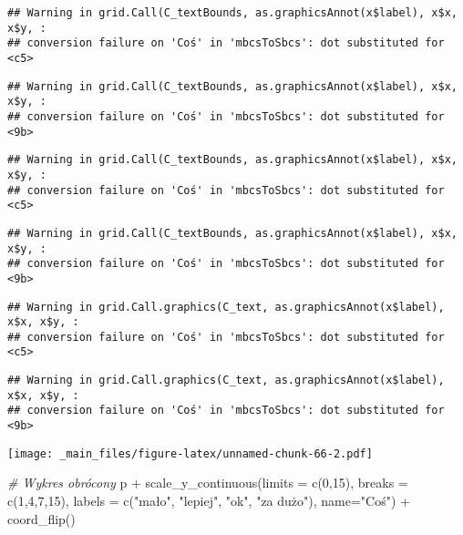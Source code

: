 \documentclass[
]{book}
\newenvironment{Shaded}{\begin{snugshade}}{\end{snugshade}}
\newcommand{\AttributeTok}[1]{\textcolor[rgb]{0.77,0.63,0.00}{#1}}
\newcommand{\CommentTok}[1]{\textcolor[rgb]{0.56,0.35,0.01}{\textit{#1}}}
\newcommand{\DecValTok}[1]{\textcolor[rgb]{0.00,0.00,0.81}{#1}}
\newcommand{\FunctionTok}[1]{\textcolor[rgb]{0.00,0.00,0.00}{#1}}
\newcommand{\NormalTok}[1]{#1}
\newcommand{\SpecialCharTok}[1]{\textcolor[rgb]{0.00,0.00,0.00}{#1}}
\newcommand{\StringTok}[1]{\textcolor[rgb]{0.31,0.60,0.02}{#1}}
\begin{document}
\begin{verbatim}
## Warning in grid.Call(C_textBounds, as.graphicsAnnot(x$label), x$x, x$y, :
## conversion failure on 'Coś' in 'mbcsToSbcs': dot substituted for <c5>
\end{verbatim}

\begin{verbatim}
## Warning in grid.Call(C_textBounds, as.graphicsAnnot(x$label), x$x, x$y, :
## conversion failure on 'Coś' in 'mbcsToSbcs': dot substituted for <9b>
\end{verbatim}

\begin{verbatim}
## Warning in grid.Call(C_textBounds, as.graphicsAnnot(x$label), x$x, x$y, :
## conversion failure on 'Coś' in 'mbcsToSbcs': dot substituted for <c5>
\end{verbatim}

\begin{verbatim}
## Warning in grid.Call(C_textBounds, as.graphicsAnnot(x$label), x$x, x$y, :
## conversion failure on 'Coś' in 'mbcsToSbcs': dot substituted for <9b>
\end{verbatim}

\begin{verbatim}
## Warning in grid.Call.graphics(C_text, as.graphicsAnnot(x$label), x$x, x$y, :
## conversion failure on 'Coś' in 'mbcsToSbcs': dot substituted for <c5>
\end{verbatim}

\begin{verbatim}
## Warning in grid.Call.graphics(C_text, as.graphicsAnnot(x$label), x$x, x$y, :
## conversion failure on 'Coś' in 'mbcsToSbcs': dot substituted for <9b>
\end{verbatim}

\texttt{[image: \_main\_files/figure-latex/unnamed-chunk-66-2.pdf]}

\begin{Shaded}
\begin{Highlighting}[]
\CommentTok{\# Wykres obrócony}
\NormalTok{p }\SpecialCharTok{+} \FunctionTok{scale\_y\_continuous}\NormalTok{(}\AttributeTok{limits =} \FunctionTok{c}\NormalTok{(}\DecValTok{0}\NormalTok{,}\DecValTok{15}\NormalTok{), }\AttributeTok{breaks =} \FunctionTok{c}\NormalTok{(}\DecValTok{1}\NormalTok{,}\DecValTok{4}\NormalTok{,}\DecValTok{7}\NormalTok{,}\DecValTok{15}\NormalTok{), }
                       \AttributeTok{labels =} \FunctionTok{c}\NormalTok{(}\StringTok{"mało"}\NormalTok{, }\StringTok{"lepiej"}\NormalTok{, }\StringTok{"ok"}\NormalTok{, }\StringTok{"za dużo"}\NormalTok{), }
                       \AttributeTok{name=}\StringTok{"Coś"}\NormalTok{) }\SpecialCharTok{+} \FunctionTok{coord\_flip}\NormalTok{()}
\end{Highlighting}
\end{Shaded}
\end{document}
